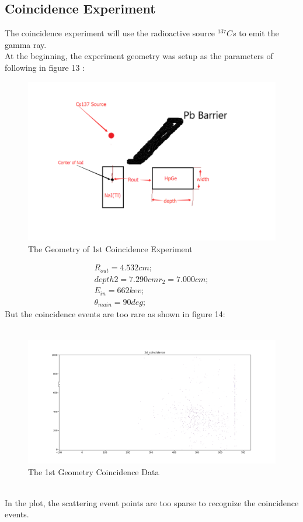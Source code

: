 \documentclass[12pt]{article}
\begin{document}
	\subsection{Coincidence Experiment}
	The coincidence experiment will use the radioactive source $^{137}Cs$ to emit the gamma ray.\\
	At the beginning, the experiment geometry was setup as the parameters of following in figure 13 :
	\begin{figure}[h]
		\centering
		\includegraphics[width=0.7\linewidth, height=0.25\textheight]{pic/Cs_137_far_geo1}
		\caption{The Geometry of 1st Coincidence Experiment}
		\label{fig:cs137fargeo1}
	\end{figure}
	\begin{gather}
		R_{out}=4.532cm;\\
		depth2=7.290cm
		r_2=7.000cm;\\
		E_{in}=662kev;\\
		\theta_{main}=90deg;
	\end{gather}
	But the coincidence events are too rare as shown in figure 14:\\\\
	\begin{figure}[h]
		\centering
		\includegraphics[width=0.7\linewidth, height=0.2\textheight]{pic/Figure_3_coin}
		\caption{The 1st Geometry Coincidence Data}
		\label{fig:figure3coin}
	\end{figure}\\
	 In the plot, the scattering event points are too sparse to recognize the coincidence events.\\
\end{document}
